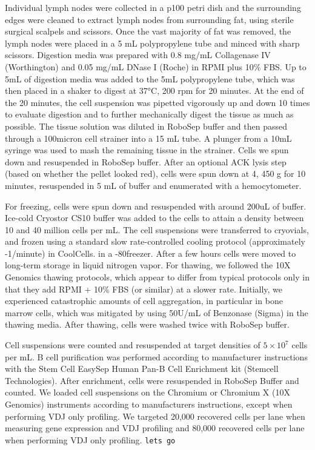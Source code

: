  Individual lymph nodes were collected in a p100 petri dish and the surrounding edges were cleaned to extract lymph nodes from surrounding fat, using sterile surgical scalpels and scissors. Once the vast majority of fat was removed, the lymph nodes were placed in a 5 mL polypropylene tube and minced with sharp scissors. Digestion media was prepared with 0.8 mg/mL Collagenase IV (Worthington) and 0.05 mg/mL DNase I (Roche) in RPMI plus 10\% FBS. Up to 5mL of digestion media was added to the 5mL polypropylene tube, which was then placed in a shaker to digest at 37°C, 200 rpm for 20 minutes. At the end of the 20 minutes, the cell suspension was pipetted vigorously up and down 10 times to evaluate digestion and to further mechanically digest the tissue as much as possible. The tissue solution was diluted in RoboSep buffer and then passed through a 100micron cell strainer into a 15 mL tube. A plunger from a 10mL syringe was used to mash the remaining tissue in the strainer. Cells we spun down and resuspended in RoboSep buffer. After an optional ACK lysis step (based on whether the pellet looked red), cells were spun down at 4\celsius, 450 g for 10 minutes, resuspended in 5 mL of  buffer and enumerated with a hemocytometer.

\noindent For freezing, cells were spun down and resuspended with around 200uL of buffer. Ice-cold Cryostor CS10 buffer was added to the cells to attain a density between 10 and 40 million cells per mL. The cell suspensions were transferred to cryovials, and frozen using a standard slow rate-controlled cooling protocol (approximately -1\celsius/minute) in CoolCells. in a -80\celsius freezer. After a few hours cells were moved to long-term storage in liquid nitrogen vapor. For thawing, we followed the 10X Genomics thawing protocols, which appear to differ from typical protocols only in that they add RPMI + 10\% FBS (or similar) at a slower rate. Initially, we experienced catastrophic amounts of cell aggregation, in particular in bone marrow cells, which was mitigated by using 50U/mL of Benzonase (Sigma) in the thawing media. After thawing, cells were washed twice with RoboSep buffer.

Cell suspensions were counted and resuspended at target densities of $5\times10^7$ cells per mL. B cell purification was performed according to manufacturer instructions with the Stem Cell EasySep Human Pan-B Cell Enrichment kit (Stemcell Technologies). After enrichment, cells were resuspended in RoboSep Buffer and counted. We loaded cell suspensions on the Chromium or Chromium X (10X Genomics) instruments according to manufacturers instructions, except when performing VDJ only profiling. We targeted 20,000 recovered cells per lane when measuring gene expression and VDJ profiling and 80,000 recovered cells per lane when performing VDJ only profiling.
\verb|lets go|

